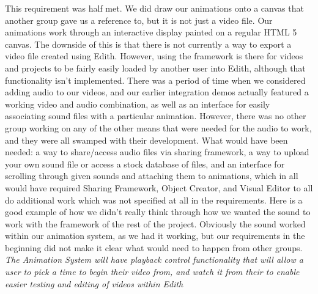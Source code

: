 \documentclass[12pt]{article}
\begin{document}
This requirement was half met. We did draw our animations onto a canvas that another group gave us a reference to, but it is not just a video file. Our animations work through an interactive display painted on a regular HTML 5 canvas. The downside of this is that there is not currently a way to export a video file created using Edith. However, using the framework is there for videos and projects to be fairly easily loaded by another user into Edith, although that functionality isn’t implemented. There was a period of time when we considered adding audio to our videos, and our earlier integration demos actually featured a working video and audio combination, as well as an interface for easily associating sound files with a particular animation. However, there was no other group working on any of the other means that were needed for the audio to work, and they were all swamped with their development. What would have been needed: a way to share/access audio files via sharing framework, a way to upload your own sound file or access a stock database of files, and an interface for scrolling through given sounds and attaching them to animations, which in all would have required Sharing Framework, Object Creator, and Visual Editor to all do additional work which was not specified at all in the requirements. Here is a good example of how we didn’t really think through how we wanted the sound to work with the framework of the rest of the project. Obviously the sound worked within our animation system, as we had it working, but our requirements in the beginning did not make it clear what would need to happen from other groups. \\

\noindent\textit{The Animation System will have playback control functionality that will allow a user to pick a time to begin their video from, and watch it from their to enable easier testing and editing of videos within Edith}\\
\end{document}
